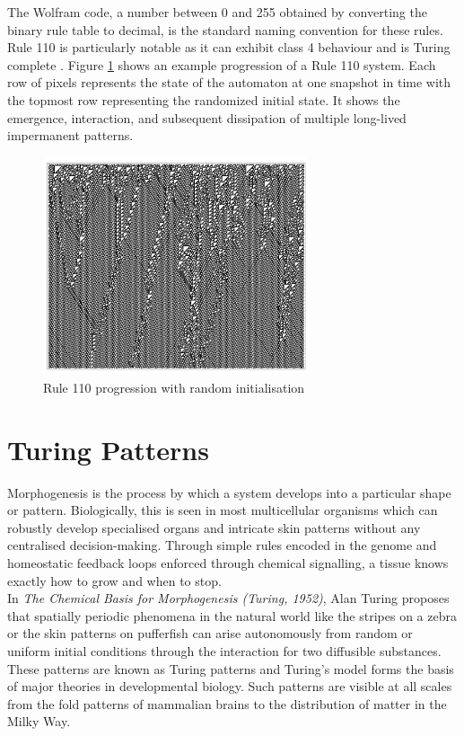 The Wolfram code, a number between 0 and 255 obtained by converting the binary rule table to decimal, is the standard naming convention for these rules. Rule 110 is particularly notable as it can exhibit class 4 behaviour \cite{wolfram2002} and is Turing complete \cite{cook2004universality}. Figure \ref{fig:rule-110} shows an example progression of a Rule 110 system. Each row of pixels represents the state of the automaton at one snapshot in time with the topmost row representing the randomized initial state. It shows the emergence, interaction, and subsequent dissipation of multiple long-lived impermanent patterns.

\begin{figure}[!h]
\centering
\includegraphics[width=0.7\textwidth]{images/rule-110.png}
\caption{Rule 110 progression with random initialisation \cite{wolfram2002}}
\label{fig:rule-110}
\end{figure}

\section{Turing Patterns}
Morphogenesis is the process by which a system develops into a particular shape or pattern.  Biologically, this is seen in most multicellular organisms which can robustly develop specialised organs and intricate skin patterns without any centralised decision-making. Through simple rules encoded in the genome and homeostatic feedback loops enforced through chemical signalling, a tissue knows exactly how to grow and when to stop.\\

In \textit{The Chemical Basis for Morphogenesis (Turing, 1952)\cite{turing1990chemical}}, Alan Turing proposes that spatially periodic phenomena in the natural world like the stripes on a zebra or the skin patterns on pufferfish can arise autonomously from random or uniform initial conditions through the interaction for two diffusible substances. These patterns are known as Turing patterns and Turing's model forms the basis of major theories in developmental biology. Such patterns are visible at all scales from the fold patterns of mammalian brains\cite{cartwright2002labyrinthine} to the distribution of matter in the Milky Way\cite{smolin1996galactic}.

